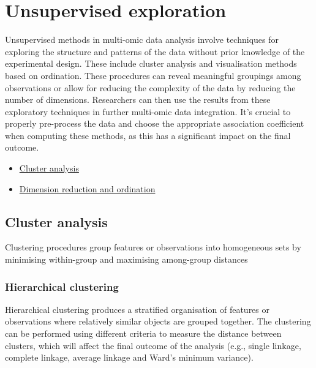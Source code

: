 \documentclass[
]{book}
\providecommand{\tightlist}{%
  \setlength{\itemsep}{0pt}\setlength{\parskip}{0pt}}
\begin{document}
\hypertarget{unsupervised-exploration}{%
\chapter{Unsupervised exploration}\label{unsupervised-exploration}}

Unsupervised methods in multi-omic data analysis involve techniques for exploring the structure and patterns of the data without prior knowledge of the experimental design. These include cluster analysis and visualisation methods based on ordination. These procedures can reveal meaningful groupings among observations or allow for reducing the complexity of the data by reducing the number of dimensions. Researchers can then use the results from these exploratory techniques in further multi-omic data integration. It's crucial to properly pre-process the data and choose the appropriate association coefficient when computing these methods, as this has a significant impact on the final outcome.

\begin{itemize}
\tightlist
\item
  \protect\hyperlink{cluster-analysis}{Cluster analysis}
\item
  \protect\hyperlink{dimension-reduction-ordination}{Dimension reduction and ordination}
\end{itemize}

\hypertarget{cluster-analysis}{%
\section{Cluster analysis}\label{cluster-analysis}}

Clustering procedures group features or observations into homogeneous sets by minimising within-group and maximising among-group distances

\hypertarget{hierarchical-clustering}{%
\subsection{Hierarchical clustering}\label{hierarchical-clustering}}

Hierarchical clustering produces a stratified organisation of features or observations where relatively similar objects are grouped together. The clustering can be performed using different criteria to measure the distance between clusters, which will affect the final outcome of the analysis (e.g., single linkage, complete linkage, average linkage and Ward's minimum variance).
\end{document}
